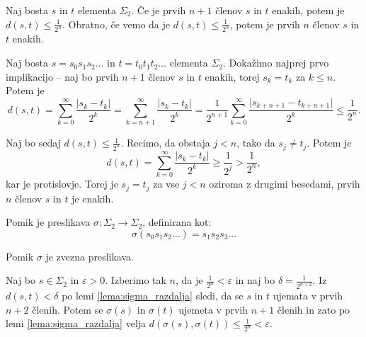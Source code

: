 \documentclass{isrmdelo}
\begin{document}
\medskip

\begin{lema}
\label{lema:sigma_razdalja}
Naj bosta $s$ in $t$ elementa $\Sigma_2$. Če je prvih $n+1$ členov $s$ in $t$ enakih, potem je $d(s,t) \leq \frac{1}{2^n}$. Obratno, če vemo da je $d(s,t) \leq \frac{1}{2^n}$, potem je prvih $n$ členov $s$ in $t$ enakih.
\end{lema}

\begin{dokaz}
Naj bosta $s = s_0 s_1 s_2 \dots$ in $t = t_0 t_1 t_2 \dots$ elementa $\Sigma_2$. Dokažimo najprej prvo implikacijo -- naj bo prvih $n+1$ členov $s$ in $t$ enakih, torej $s_k = t_k$ za $k \leq n$. Potem je $$d(s,t) = \sum_{k=0}^{\infty} \frac{\vert s_k - t_k \vert}{2^k} = \sum_{k=n+1}^{\infty} \frac{\vert s_k - t_k \vert}{2^k} = \frac{1}{2^{n+1}} \sum_{k=0}^{\infty} \frac{\vert s_{k+n+1} - t_{k+n+1} \vert}{2^k} \leq \frac{1}{2^n}.$$

Naj bo sedaj $d(s,t) \leq \frac{1}{2^n}$. Recimo, da obstaja $j < n$, tako da $s_j \neq t_j$. Potem je $$d(s,t) = \sum_{k=0}^{\infty} \frac{\vert s_k - t_k \vert}{2^k} \geq \frac{1}{2^j} > \frac{1}{2^n},$$ kar je protislovje. Torej je $s_j = t_j$ za vse $j < n$ oziroma z drugimi besedami, prvih $n$ členov $s$ in $t$ je enakih. \qedhere
\end{dokaz}

\bigskip

\begin{definicija}
Pomik je preslikava $\sigma: \Sigma_2 \rightarrow \Sigma_2$, definirana kot:
\begin{equation*}
    \sigma(s_0 s_1 s_2 \dots) = s_1 s_2 s_3 \dots
\end{equation*}
\end{definicija}

\begin{trditev}
Pomik $\sigma$ je zvezna preslikava.
\end{trditev}

\begin{dokaz}
Naj bo $s \in \Sigma_2$ in $\varepsilon > 0$. Izberimo tak $n$, da je $\frac{1}{2^n} < \varepsilon$ in naj bo $\delta = \frac{1}{2^{n+2}}$. Iz $d(s,t) < \delta$ po lemi \ref{lema:sigma_razdalja} sledi, da se $s$ in $t$ ujemata v prvih $n+2$ členih. Potem se $\sigma(s)$ in $\sigma(t)$ ujemeta v prvih $n+1$ členih in zato po lemi \ref{lema:sigma_razdalja} velja $d(\sigma(s), \sigma(t)) \leq \frac{1}{2^n} < \varepsilon$. \qedhere
\end{dokaz}
\end{document}
